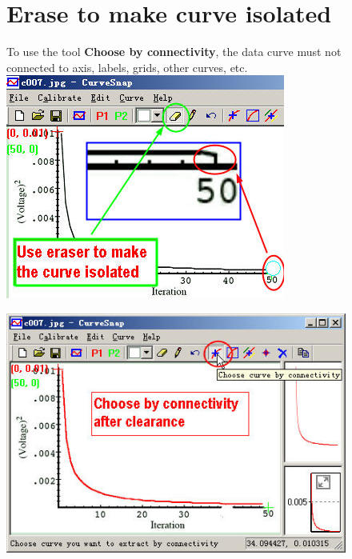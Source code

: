 \documentclass[12pt]{article}
\begin{document}
\begin{figure}[ht!]
\section{Erase to make curve isolated}
  To use the tool \textbf{Choose by connectivity}, the data curve must not connected to axis, labels, grids, other curves, etc.
  \center \includegraphics{./tut_files/09_eraser.jpg}
\end{figure}

\begin{figure}[ht!]
  \center \includegraphics{./tut_files/10_choose_after_eraser.jpg}
\end{figure}
\end{document}
